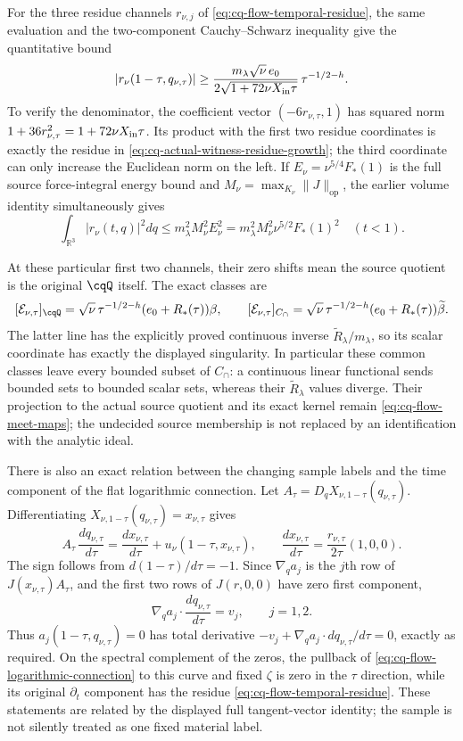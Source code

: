 For the three residue channels $r_{\nu,j}$ of
\eqref{eq:cq-flow-temporal-residue}, the same evaluation and the
two-component Cauchy--Schwarz inequality give the quantitative bound
\begin{equation}
 |r_\nu(1-\tau,q_{\nu,\tau})|
 \geq
 \frac{m_\lambda\sqrt\nu\,e_0}
             {2\sqrt{1+72\nu X_{\rm in}\tau}}\,
                   \tau^{-1/2-h}.
 \label{eq:cq-actual-witness-residue-vector-growth}
\end{equation}
To verify the denominator, the coefficient vector
$(-6r_{\nu,\tau},1)$ has squared norm
$1+36r_{\nu,\tau}^2=1+72\nu X_{\rm in}\tau$.
Its product with the first two residue coordinates is exactly
the residue in \eqref{eq:cq-actual-witness-residue-growth}; the
third coordinate can only increase the Euclidean norm on the left.
If $E_\nu=\nu^{5/4}F_*(1)$ is the full source force-integral energy
bound and $M_\nu=\max_{K_\nu}\|J\|_{\mathrm{op}}$, the earlier
volume identity simultaneously gives
\[
 \int_{\mathbb R^3}|r_\nu(t,q)|^2dq
 \leq m_\lambda^2M_\nu^2E_\nu^2
 =m_\lambda^2M_\nu^2\nu^{5/2}F_*(1)^2\quad(t<1).
\]

At these particular first two channels, their zero shifts mean the
source quotient is the original $\cqQ$ itself. The exact classes are
\[
 [\mathcal E_{\nu,\tau}]_{\cqQ}
 =\sqrt\nu\,\tau^{-1/2-h}(e_0+R_*(\tau))\beta,\qquad
 [\mathcal E_{\nu,\tau}]_{C_\cap}
 =\sqrt\nu\,\tau^{-1/2-h}(e_0+R_*(\tau))\widetilde\beta.
\]
The latter line has the explicitly proved continuous inverse
$\widetilde R_\lambda/m_\lambda$, so its scalar coordinate has
exactly the displayed singularity. In particular these common
classes leave every bounded subset of $C_\cap$: a continuous linear
functional sends bounded sets to bounded scalar sets, whereas their
$\widetilde R_\lambda$ values diverge. Their projection to the
actual source quotient and its exact kernel remain
\eqref{eq:cq-flow-meet-maps}; the undecided source membership is
not replaced by an identification with the analytic ideal.

There is also an exact relation between the changing sample labels
and the time component of the flat logarithmic connection.
Let $A_\tau=D_qX_{\nu,1-\tau}(q_{\nu,\tau})$. Differentiating
$X_{\nu,1-\tau}(q_{\nu,\tau})=x_{\nu,\tau}$ gives
\[
 A_\tau\,\frac{dq_{\nu,\tau}}{d\tau}
 =\frac{dx_{\nu,\tau}}{d\tau}
       +u_\nu(1-\tau,x_{\nu,\tau}),\qquad
 \frac{dx_{\nu,\tau}}{d\tau}
       =\frac{r_{\nu,\tau}}{2\tau}(1,0,0).
\]
The sign follows from $d(1-\tau)/d\tau=-1$.
Since $\nabla_q a_j$ is the $j$th row of $J(x_{\nu,\tau})A_\tau$,
and the first two rows of $J(r,0,0)$ have zero first component,
\[
 \nabla_q a_j\cdot\frac{dq_{\nu,\tau}}{d\tau}=v_j,\qquad j=1,2.
\]
Thus $a_j(1-\tau,q_{\nu,\tau})=0$ has total derivative
$-v_j+\nabla_q a_j\cdot dq_{\nu,\tau}/d\tau=0$, exactly as required.
On the spectral complement of the zeros, the pullback of
\eqref{eq:cq-flow-logarithmic-connection} to this curve and fixed
$\zeta$ is zero in the $\tau$ direction, while its original
$\partial_t$ component has the residue
\eqref{eq:cq-flow-temporal-residue}. These statements are related
by the displayed full tangent-vector identity; the sample is not
silently treated as one fixed material label.

